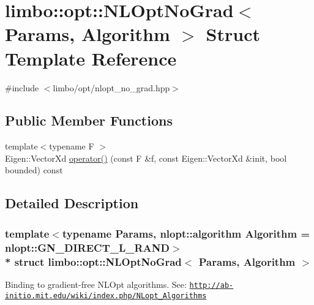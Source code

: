 \hypertarget{structlimbo_1_1opt_1_1_n_l_opt_no_grad}{}\section{limbo\+:\+:opt\+:\+:N\+L\+Opt\+No\+Grad$<$ Params, Algorithm $>$ Struct Template Reference}
\label{structlimbo_1_1opt_1_1_n_l_opt_no_grad}


{\ttfamily \#include $<$limbo/opt/nlopt\+\_\+no\+\_\+grad.\+hpp$>$}

\subsection*{Public Member Functions}
\begin{DoxyCompactItemize}
\item 
{\footnotesize template$<$typename F $>$ }\\Eigen\+::\+Vector\+Xd \hyperlink{structlimbo_1_1opt_1_1_n_l_opt_no_grad_a23cdeb4f9c63e44bd7fb4dbf8d8553d7}{operator()} (const F \&f, const Eigen\+::\+Vector\+Xd \&init, bool bounded) const 
\end{DoxyCompactItemize}


\subsection{Detailed Description}
\subsubsection*{template$<$typename Params, nlopt\+::algorithm Algorithm = nlopt\+::\+G\+N\+\_\+\+D\+I\+R\+E\+C\+T\+\_\+\+L\+\_\+\+R\+A\+ND$>$\\*
struct limbo\+::opt\+::\+N\+L\+Opt\+No\+Grad$<$ Params, Algorithm $>$}

Binding to gradient-\/free N\+L\+Opt algorithms. See\+: \href{http://ab-initio.mit.edu/wiki/index.php/NLopt_Algorithms}{\tt http\+://ab-\/initio.\+mit.\+edu/wiki/index.\+php/\+N\+Lopt\+\_\+\+Algorithms}

